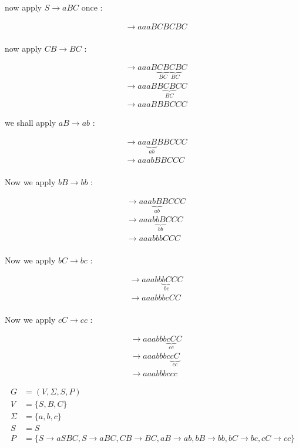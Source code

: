 \documentclass[12pt]{book}
\begin{document}
now apply $S \to aBC$ once :

\begin{align*}
  &\to aaaBCBCBC \\
\end{align*}

now apply $CB \to BC$ :

\begin{align*}
  &\to aaaB\underbrace{CB}_{BC}\underbrace{CB}_{BC}C \\
  &\to aaaBB\underbrace{CB}_{BC}CC \\
  &\to aaaBBBCCC
\end{align*}

we shall apply $aB \to ab$ :

\begin{align*}
  &\to aa\underbrace{aB}_{ab}BBCCC \\
  &\to aaabBBCCC \\
\end{align*}

Now we apply $bB \to bb$ :

\begin{align*}
  &\to aaa\underbrace{bB}_{ab}BCCC \\
  &\to aaab\underbrace{bB}_{bb}CCC \\
  &\to aaabbbCCC \\
\end{align*}

Now we apply $bC \to bc$ :

\begin{align*}
  &\to aaabb\underbrace{bC}_{bc}CC \\
  &\to aaabbbcCC \\
\end{align*}


Now we apply $cC \to cc$ :

\begin{align*}
  &\to aaabbb\underbrace{cC}_{cc}C \\
  &\to aaabbbc\underbrace{cC}_{cc} \\
  &\to aaabbbccc
\end{align*}



\begin{align*}
G &= (V, \Sigma, S, P) \\
V &= \{ S , B, C \} \\
\Sigma &= \{ a, b, c \} \\
S &= S \\
P &= \{ S \to aSBC ,
S \to aBC ,
CB \to BC ,
aB \to ab ,
bB \to bb ,
bC \to bc ,
cC \to cc \}
\end{align*}
\end{document}

